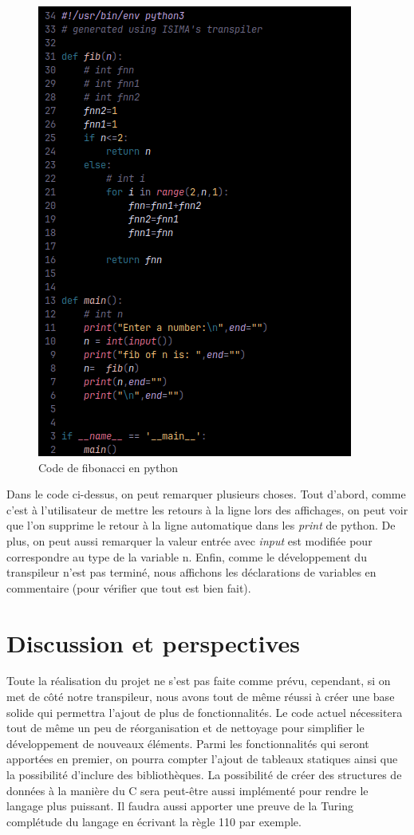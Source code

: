 \documentclass[a4paper]{article}%
\begin{document}
\begin{figure}[h]
  \begin{center}
  \includegraphics[scale=0.7]{./img/fib-prog-code.png}
  \caption{Code de fibonacci en python}
  \end{center}
\end{figure}

Dans le code ci-dessus, on peut remarquer plusieurs choses. Tout d'abord, comme
c'est à l'utilisateur de mettre les retours à la ligne lors des affichages, on
peut voir que l'on supprime le retour à la ligne automatique dans les
\textit{print} de python. De plus, on peut aussi remarquer la valeur entrée
avec \textit{input} est modifiée pour correspondre au type de la variable n.
Enfin, comme le développement du transpileur n'est pas terminé, nous affichons
les déclarations de variables en commentaire (pour vérifier que tout est bien
fait).

\clearpage
\section{Discussion et perspectives}

Toute la réalisation du projet ne s'est pas faite comme prévu, cependant, si on
met de côté notre transpileur, nous avons tout de même réussi à créer une base
solide qui permettra l'ajout de plus de fonctionnalités. Le code actuel
nécessitera tout de même un peu de réorganisation et de nettoyage pour
simplifier le développement de nouveaux éléments. Parmi les fonctionnalités qui
seront apportées en premier, on pourra compter l'ajout de tableaux statiques
ainsi que la possibilité d'inclure des bibliothèques. La possibilité de créer
des structures de données à la manière du C sera peut-être aussi implémenté pour
rendre le langage plus puissant. Il faudra aussi apporter une preuve de la
Turing complétude du langage en écrivant la règle 110 par exemple.\\
\end{document}

